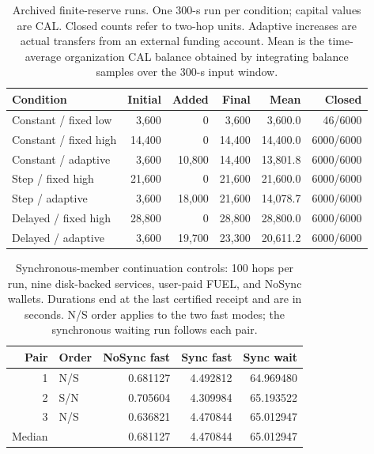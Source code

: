 \begin{table}[!ht]
\centering\small
\caption{Archived finite-reserve runs. One 300-s run per condition; capital values are CAL. Closed counts refer to two-hop units. Adaptive increases are actual transfers from an external funding account. Mean is the time-average organization CAL balance obtained by integrating balance samples over the 300-s input window.}
\label{tab:supp-reserve}
\begin{tabular}{@{}lrrrrr@{}}
\toprule
Condition & Initial & Added & Final & Mean & Closed \\
\midrule
Constant / fixed low & 3,600 & 0 & 3,600 & 3,600.0 & 46/6000 \\
Constant / fixed high & 14,400 & 0 & 14,400 & 14,400.0 & 6000/6000 \\
Constant / adaptive & 3,600 & 10,800 & 14,400 & 13,801.8 & 6000/6000 \\
Step / fixed high & 21,600 & 0 & 21,600 & 21,600.0 & 6000/6000 \\
Step / adaptive & 3,600 & 18,000 & 21,600 & 14,078.7 & 6000/6000 \\
Delayed / fixed high & 28,800 & 0 & 28,800 & 28,800.0 & 6000/6000 \\
Delayed / adaptive & 3,600 & 19,700 & 23,300 & 20,611.2 & 6000/6000 \\
\bottomrule
\end{tabular}
\end{table}

\begin{table}[!ht]
\centering\small
\caption{Synchronous-member continuation controls: 100 hops per run, nine disk-backed services, user-paid FUEL, and NoSync wallets. Durations end at the last certified receipt and are in seconds. N/S order applies to the two fast modes; the synchronous waiting run follows each pair.}
\label{tab:supp-sync-chain}
\begin{tabular}{@{}rlrrr@{}}
\toprule
Pair & Order & NoSync fast & Sync fast & Sync wait \\
\midrule
1 & N/S & 0.681127 & 4.492812 & 64.969480 \\
2 & S/N & 0.705604 & 4.309984 & 65.193522 \\
3 & N/S & 0.636821 & 4.470844 & 65.012947 \\
\midrule
Median & & 0.681127 & 4.470844 & 65.012947 \\
\bottomrule
\end{tabular}
\end{table}
